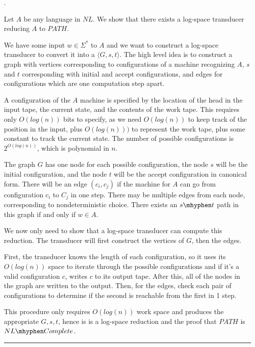 \documentclass[twoside]{article}
\newenvironment{proof}{{\bf Proof:}}{\hfill\rule{2mm}{2mm}}
\begin{document}
	. 
\begin{proof}	 
	
	Let $A$ be any language in $NL$.  We show that there exists a log-space transducer reducing $A$ to $PATH$.
	
	We have some input $w\in\Sigma^*$ to $A$ and we want to construct a log-space transducer to convert it into a $\langle G,s,t\rangle$.  The high level idea is to construct a graph with vertices corresponding to configurations of a machine recognizing $A$, $s$ and $t$ corresponding with initial and accept configurations, and edges for configurations which are one computation step apart.
	
	A configuration of the $A$ machine is specified by the location of the head in the input tape, the current state, and the contents of the work tape.  This requires only $O(log(n))$ bits to specify, as we need $O(log(n))$ to keep track of the position in the input, plus $O(log(n)))$ to represent the work tape, plus some constant to track the current state.  The number of possible configurations is $2^{O(log(n))}$, which is polynomial in $n$.
	
	The graph $G$ has one node for each possible configuration, the node $s$ will be the initial configuration, and the node $t$ will be the accept configuration in canonical form.  There will be an edge $(c_i,c_j)$ if the machine for $A$ can go from configuration $c_i$ to $C_j$ in one step.  There may be multiple edges from each node, corresponding to nondeterministic choice.  There exists an $s\mhyphen t$ path in this graph if and only if $w\in A$.
	
	We now only need to show that a log-space transducer can compute this reduction.  The transducer will first construct the vertices of $G$, then the edges.
	
	First, the transducer knows the length of each configuration, so it uses its $O(log(n))$ space to iterate through the possible configurations and if it's a valid configuration $c$, writes $c$ to its output tape.  After this, all of the nodes in the graph are written to the output.  Then, for the edges, check each pair of configurations to determine if the second is reachable from the first in 1 step.
	
	This procedure only requires $O(log(n))$ work space and produces the appropriate $G, s,t$, hence is is a log-space reduction and the proof that $PATH$ is $NL\mhyphen Complete$.
	
	
	 
\end{proof}
\end{document}
